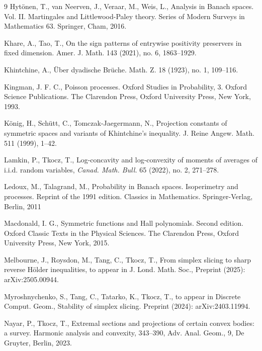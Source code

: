 \documentclass[10pt]{article}
\newcommand{\1}{\textbf{1}}
\theoremstyle{remark}
\theoremstyle{definition}
\begin{document}
\begin{thebibliography}{9}
Hyt\"onen, T., van Neerven, J., Veraar, M., Weis, L., Analysis in Banach spaces. Vol. II. Martingales and Littlewood-Paley theory. Series of Modern Surveys in Mathematics  63. Springer, Cham, 2016.


Khare, A., Tao, T., 
On the sign patterns of entrywise positivity preservers in fixed dimension. 
Amer. J. Math. 143 (2021), no. 6, 1863--1929.

Khintchine, A.,
\"Uber dyadische Br\"uche.
Math. Z. 18 (1923), no. 1, 109--116.



Kingman, J. F. C., Poisson processes. Oxford Studies in Probability, 3. Oxford Science Publications. The Clarendon Press, Oxford University Press, New York, 1993.



K\"onig, H., Sch\"utt, C., Tomczak-Jaegermann, N.,
Projection constants of symmetric spaces and variants of Khintchine's inequality.
J. Reine Angew. Math. 511 (1999), 1--42.



Lamkin, P., Tkocz, T., Log-concavity and log-convexity of moments of averages of i.i.d. random variables, \emph{Canad. Math. Bull.} 65 (2022), no. 2, 271--278.


Ledoux, M., Talagrand, M., 
Probability in Banach spaces. Isoperimetry and processes. 
Reprint of the 1991 edition. Classics in Mathematics. Springer-Verlag, Berlin, 2011


Macdonald, I. G.,
Symmetric functions and Hall polynomials. Second edition. Oxford Classic Texts in the Physical Sciences. The Clarendon Press, Oxford University Press, New York, 2015.


Melbourne, J., Roysdon, M., Tang, C., Tkocz, T.,
From simplex slicing to sharp reverse Hölder inequalities, to appear in J. Lond. Math. Soc.,
Preprint (2025): arXiv:2505.00944.



Myroshnychenko, S., Tang, C., Tatarko, K., Tkocz, T., to appear in Discrete Comput. Geom.,
Stability of simplex slicing.
Preprint (2024): arXiv:2403.11994.



Nayar, P., Tkocz, T., Extremal sections and projections of certain convex bodies: a survey. Harmonic analysis and convexity, 343--390, Adv. Anal. Geom., 9, De Gruyter, Berlin, 2023.


\end{thebibliography}
\end{document}
